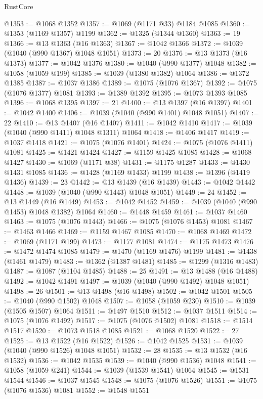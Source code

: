 \begin{lexlean}{RustCore}
\begin{coremodule}
@1353 := @1068 @1352
@1357 := @1069 (@1171 @33) @1184 @1085
@1360 := @1353 (@1169 @1357) @1199
@1362 := @1325 (@1344 @1360)
@1363 := 19
@1366 := @13 @1363 (@16 @1363)
@1367 := @1042 @1366
@1372 := @1039 (@1040 (@990 @1367) @1048 @1051)
@1373 := 20
@1376 := @13 @1373 (@16 @1373)
@1377 := @1042 @1376
@1380 := @1040 (@990 @1377) @1048
@1382 := @1058 (@1059 @199)
@1385 := @1039 (@1380 @1382) @1064
@1386 := @1372 @1385
@1387 := @1037 @1386
@1389 := @1075 (@1076 @1367)
@1392 := @1075 (@1076 @1377) @1081
@1393 := @1389 @1392
@1395 := @1073 @1393 @1085
@1396 := @1068 @1395
@1397 := 21
@1400 := @13 @1397 (@16 @1397)
@1401 := @1042 @1400
@1406 := @1039 (@1040 (@990 @1401) @1048 @1051)
@1407 := 22
@1410 := @13 @1407 (@16 @1407)
@1411 := @1042 @1410
@1417 := @1039 (@1040 (@990 @1411) @1048 @1311) @1064
@1418 := @1406 @1417
@1419 := @1037 @1418
@1421 := @1075 (@1076 @1401)
@1424 := @1075 (@1076 @1411) @1081
@1425 := @1421 @1424
@1427 := @1159 @1425 @1085
@1428 := @1068 @1427
@1430 := @1069 (@1171 @38)
@1431 := @1175 @1287
@1433 := @1430 @1431 @1085
@1436 := @1428 (@1169 @1433) @1199
@1438 := @1396 (@1419 @1436)
@1439 := 23
@1442 := @13 @1439 (@16 @1439)
@1443 := @1042 @1442
@1448 := @1039 (@1040 (@990 @1443) @1048 @1051)
@1449 := 24
@1452 := @13 @1449 (@16 @1449)
@1453 := @1042 @1452
@1459 := @1039 (@1040 (@990 @1453) @1048 @1382) @1064
@1460 := @1448 @1459
@1461 := @1037 @1460
@1463 := @1075 (@1076 @1443)
@1466 := @1075 (@1076 @1453) @1081
@1467 := @1463 @1466
@1469 := @1159 @1467 @1085
@1470 := @1068 @1469
@1472 := @1069 (@1171 @199)
@1473 := @1177 @1081
@1474 := @1175 @1473
@1476 := @1472 @1474 @1085
@1479 := @1470 (@1169 @1476) @1199
@1481 := @1438 (@1461 @1479)
@1483 := @1362 (@1387 @1481)
@1485 := @1299 (@1316 @1483)
@1487 := @1087 (@1104 @1485)
@1488 := 25
@1491 := @13 @1488 (@16 @1488)
@1492 := @1042 @1491
@1497 := @1039 (@1040 (@990 @1492) @1048 @1051)
@1498 := 26
@1501 := @13 @1498 (@16 @1498)
@1502 := @1042 @1501
@1505 := @1040 (@990 @1502) @1048
@1507 := @1058 (@1059 @230)
@1510 := @1039 (@1505 @1507) @1064
@1511 := @1497 @1510
@1512 := @1037 @1511
@1514 := @1075 (@1076 @1492)
@1517 := @1075 (@1076 @1502) @1081
@1518 := @1514 @1517
@1520 := @1073 @1518 @1085
@1521 := @1068 @1520
@1522 := 27
@1525 := @13 @1522 (@16 @1522)
@1526 := @1042 @1525
@1531 := @1039 (@1040 (@990 @1526) @1048 @1051)
@1532 := 28
@1535 := @13 @1532 (@16 @1532)
@1536 := @1042 @1535
@1539 := @1040 (@990 @1536) @1048
@1541 := @1058 (@1059 @241)
@1544 := @1039 (@1539 @1541) @1064
@1545 := @1531 @1544
@1546 := @1037 @1545
@1548 := @1075 (@1076 @1526)
@1551 := @1075 (@1076 @1536) @1081
@1552 := @1548 @1551

\end{coremodule}
\end{lexlean}
